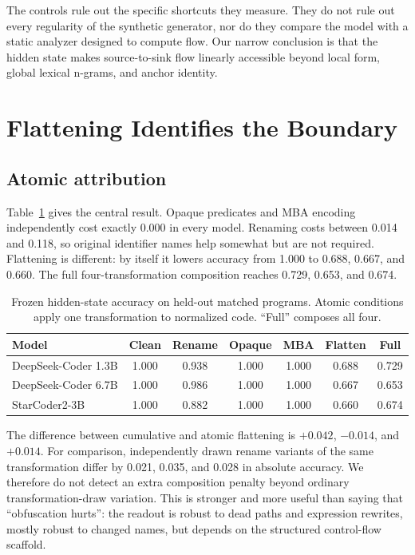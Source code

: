 \documentclass{article}
\begin{document}
The controls rule out the specific shortcuts they measure. They do not rule out every regularity of the synthetic generator, nor do they compare the model with a static analyzer designed to compute flow. Our narrow conclusion is that the hidden state makes source-to-sink flow linearly accessible beyond local form, global lexical n-grams, and anchor identity.

\section{Flattening Identifies the Boundary}
\subsection{Atomic attribution}
Table~\ref{tab:atomic} gives the central result. Opaque predicates and MBA encoding independently cost exactly 0.000 in every model. Renaming costs between 0.014 and 0.118, so original identifier names help somewhat but are not required. Flattening is different: by itself it lowers accuracy from 1.000 to 0.688, 0.667, and 0.660. The full four-transformation composition reaches 0.729, 0.653, and 0.674.

\begin{table}[t]
\centering\small
\caption{Frozen hidden-state accuracy on held-out matched programs. Atomic conditions apply one transformation to normalized code. ``Full'' composes all four.}
\label{tab:atomic}
\begin{tabular}{lcccccc}
\toprule
Model & Clean & Rename & Opaque & MBA & Flatten & Full \\
\midrule
DeepSeek-Coder 1.3B & 1.000 & 0.938 & 1.000 & 1.000 & 0.688 & 0.729\\
DeepSeek-Coder 6.7B & 1.000 & 0.986 & 1.000 & 1.000 & 0.667 & 0.653\\
StarCoder2-3B       & 1.000 & 0.882 & 1.000 & 1.000 & 0.660 & 0.674\\
\bottomrule
\end{tabular}
\end{table}

The difference between cumulative and atomic flattening is $+0.042$, $-0.014$, and $+0.014$. For comparison, independently drawn rename variants of the same transformation differ by 0.021, 0.035, and 0.028 in absolute accuracy. We therefore do not detect an extra composition penalty beyond ordinary transformation-draw variation. This is stronger and more useful than saying that ``obfuscation hurts'': the readout is robust to dead paths and expression rewrites, mostly robust to changed names, but depends on the structured control-flow scaffold.
\end{document}
